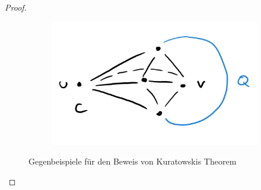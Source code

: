 \begin{proof}
\begin{figure}
\begin{subfigure}[c]{\w}
            \label{fig:kuratowski-bsp3}
        \end{subfigure}
        \begin{subfigure}[c]{\w}
            \centering
            \includegraphics[width=\textwidth]{figures/kuratowski4.png}
            \label{fig:kuratowski-bsp4}
        \end{subfigure}
        \caption{Gegenbeispiele für den Beweis von Kuratowskis Theorem}
        \label{fig:kuratowski-bsp}
    \end{figure}
\end{proof}
